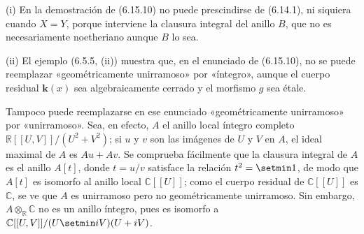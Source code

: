 \begin{remarks}[6.15.11]
\label{IV.2.s6.15.11-fr}
(i) En la demostración de (6.15.10) no puede prescindirse
de (6.14.1), ni siquiera cuando $X=Y$, porque interviene
la clausura integral del anillo $B$, que no es necesariamente
noetheriano aunque $B$ lo sea.

(ii) El ejemplo (6.5.5, (ii)) muestra que, en el enunciado
de (6.15.10), no se puede reemplazar «geométricamente
unirramoso» por «íntegro», aunque el cuerpo residual $\boldsymbol{k}(x)$
sea algebraicamente cerrado y el morfismo $g$ sea étale.

Tampoco puede reemplazarse en ese enunciado
«geométricamente unirramoso» por «unirramoso». Sea, en
efecto, $A$ el anillo local íntegro completo
$\mathbb R[[U,V]]/(U^2+V^2)$;
si $u$ y $v$ son las imágenes de $U$ y $V$ en $A$, el ideal
maximal de $A$ es $Au+Av$. Se comprueba fácilmente que la
clausura integral de $A$ es el anillo $A[t]$, donde $t=u/v$
satisface la relación $t^2=\setmin 1$, de modo que $A[t]$ es
isomorfo al anillo local $\mathbb C[[U]]$; como el cuerpo
residual de $\mathbb C[[U]]$ es $\mathbb C$, se ve que $A$
es unirramoso pero no geométricamente unirramoso. Sin
embargo, $A\otimes_{\mathbb R}\mathbb C$ no es un anillo
íntegro, pues es isomorfo a $\mathbb C[[U,V]]/(U\setmin iV)(U+iV)$.
\end{remarks}
